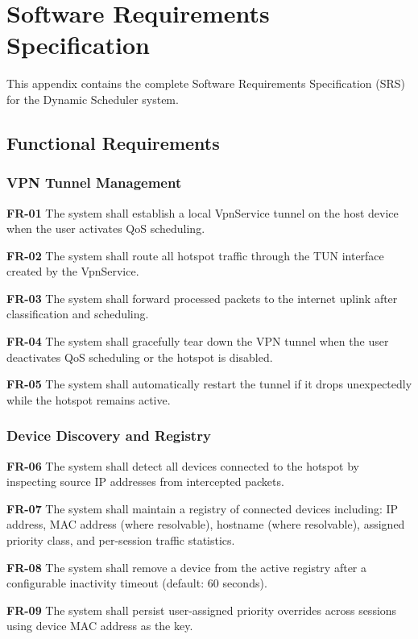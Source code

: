 \chapter{Software Requirements Specification}
\label{app:srs}

This appendix contains the complete Software Requirements Specification (SRS) for the Dynamic \qos Scheduler system.

\section{Functional Requirements}

\subsection{VPN Tunnel Management}

\textbf{FR-01} The system shall establish a local VpnService tunnel on the host device when the user activates QoS scheduling.

\textbf{FR-02} The system shall route all hotspot traffic through the TUN interface created by the VpnService.

\textbf{FR-03} The system shall forward processed packets to the internet uplink after classification and scheduling.

\textbf{FR-04} The system shall gracefully tear down the VPN tunnel when the user deactivates QoS scheduling or the hotspot is disabled.

\textbf{FR-05} The system shall automatically restart the tunnel if it drops unexpectedly while the hotspot remains active.

\subsection{Device Discovery and Registry}

\textbf{FR-06} The system shall detect all devices connected to the hotspot by inspecting source IP addresses from intercepted packets.

\textbf{FR-07} The system shall maintain a registry of connected devices including: IP address, MAC address (where resolvable), hostname (where resolvable), assigned priority class, and per-session traffic statistics.

\textbf{FR-08} The system shall remove a device from the active registry after a configurable inactivity timeout (default: 60 seconds).

\textbf{FR-09} The system shall persist user-assigned priority overrides across sessions using device MAC address as the key.

